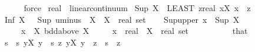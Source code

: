 \begin{isabellebody}
\ \ \ \ \isamarkupfalse%
\ force\isanewline
{}\isamarkupfalse%
%
\endisatagproof
{\isafoldproof}%
%
\isadelimproof
\isanewline
%
\endisadelimproof
\isanewline
{}\isamarkupfalse%
\ real\ {\isacharcolon}{\kern0pt}{\isacharcolon}{\kern0pt}\ linear{\isacharunderscore}{\kern0pt}continuum\isanewline
{}%
\isadelimdocument
%
\endisadelimdocument
%
\isatagdocument
%
\isamarkuptrue%
%
\endisatagdocument
{\isafolddocument}%
%
\isadelimdocument
%
\endisadelimdocument
{}\isamarkupfalse%
\ {\isachardoublequoteopen}Sup\ X\ {\isacharequal}{\kern0pt}\ {\isacharparenleft}{\kern0pt}LEAST\ z{\isacharcolon}{\kern0pt}{\isacharcolon}{\kern0pt}real{\isachardot}{\kern0pt}\ {\isasymforall}x{\isasymin}X{\isachardot}{\kern0pt}\ x\ {\isasymle}\ z{\isacharparenright}{\kern0pt}{\isachardoublequoteclose}\isanewline
{}\isamarkupfalse%
\ {\isachardoublequoteopen}Inf\ X\ {\isacharequal}{\kern0pt}\ {\isacharminus}{\kern0pt}\ Sup\ {\isacharparenleft}{\kern0pt}uminus\ {\isacharbackquote}{\kern0pt}\ X{\isacharparenright}{\kern0pt}{\isachardoublequoteclose}\ \ X\ {\isacharcolon}{\kern0pt}{\isacharcolon}{\kern0pt}\ {\isachardoublequoteopen}real\ set{\isachardoublequoteclose}\isanewline
\isanewline
{}\isamarkupfalse%
\isanewline
%
\isadelimproof
%
\endisadelimproof
%
\isatagproof
{}\isamarkupfalse%
\isanewline
\ \ \isamarkupfalse%
\ Sup{\isacharunderscore}{\kern0pt}upper{\isacharcolon}{\kern0pt}\ {\isachardoublequoteopen}x\ {\isasymle}\ Sup\ X{\isachardoublequoteclose}\isanewline
\ \ \ \ \ {\isachardoublequoteopen}x\ {\isasymin}\ X{\isachardoublequoteclose}\ {\isachardoublequoteopen}bdd{\isacharunderscore}{\kern0pt}above\ X{\isachardoublequoteclose}\isanewline
\ \ \ \ \ x\ {\isacharcolon}{\kern0pt}{\isacharcolon}{\kern0pt}\ real\ \ X\ {\isacharcolon}{\kern0pt}{\isacharcolon}{\kern0pt}\ {\isachardoublequoteopen}real\ set{\isachardoublequoteclose}\isanewline
\ \ \isamarkupfalse%
\ {\isacharminus}{\kern0pt}\isanewline
\ \ \ \ \isamarkupfalse%
\ that\ \isamarkupfalse%
\ s\ \ s{\isacharcolon}{\kern0pt}\ {\isachardoublequoteopen}{\isasymforall}y{\isasymin}X{\isachardot}{\kern0pt}\ y\ {\isasymle}\ s{\isachardoublequoteclose}\ {\isachardoublequoteopen}{\isasymAnd}z{\isachardot}{\kern0pt}\ {\isasymforall}y{\isasymin}X{\isachardot}{\kern0pt}\ y\ {\isasymle}\ z\ {\isasymLongrightarrow}\ s\ {\isasymle}\ z{\isachardoublequoteclose}\isanewline

\end{isabellebody}
